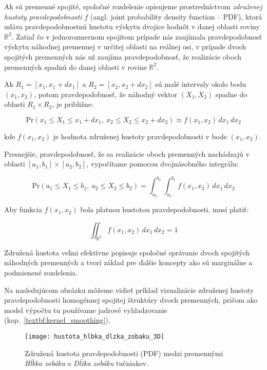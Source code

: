 Ak sú premenné spojité, spoločné rozdelenie opisujeme prostredníctvom \textit{združenej hustoty pravdepodobnosti} $f$ (angl. joint probability density function – PDF), ktorá udáva pravdepodobnostnú hustotu výskytu dvojice hodnôt v danej oblasti roviny $\mathbb{R}^2$.
Zatiaľ čo v jednorozmernom spojitom prípade nás zaujímala pravdepodobnosť výskytu náhodnej premennej v určitej oblasti na reálnej osi, v prípade dvoch spojitých premenných nás už zaujíma pravdepodobnosť, že realizácie oboch premenných spadnú do danej oblasti v rovine $\mathbb{R}^2$.

Ak $R_1 = [x_1, x_1 + dx_1]$ a $R_2 = [x_2, x_2 + dx_2]$ sú malé intervaly okolo bodu $(x_1, x_2)$, potom pravdepodobnosť, že náhodný vektor $(X_1, X_2)$ spadne do oblasti $R_1 \times R_2$, je približne:

\begin{equation}
\mathrm{Pr}(x_1 \leq X_1 \leq x_1 + dx_1,\ x_2 \leq X_2 \leq x_2 + dx_2) \approx f(x_1, x_2) \, dx_1 \, dx_2
\end{equation}

kde $f(x_1, x_2)$ je hodnota združenej hustoty pravdepodobnosti v bode $(x_1, x_2)$.

Presnejšie, pravdepodobnosť, že sa realizácie oboch premenných nachádzajú v oblasti $[a_1, b_1] \times [a_2, b_2]$, vypočítame pomocou dvojnásobného integrálu:

\begin{equation}
\mathrm{Pr}(a_1 \leq X_1 \leq b_1,\ a_2 \leq X_2 \leq b_2) = \int_{a_2}^{b_2} \int_{a_1}^{b_1} f(x_1, x_2) \, dx_1 \, dx_2
\end{equation}

Aby funkcia $f(x_1, x_2)$ bola platnou hustotou pravdepodobnosti, musí platiť:

\begin{equation}
\iint_{\mathbb{R}^2} f(x_1, x_2) \, dx_1 \, dx_2 = 1
\end{equation}

Združená hustota veľmi efektívne popisuje spoločné správanie dvoch spojitých náhodných premenných a tvorí základ pre ďalšie koncepty ako sú marginálne a podmienené rozdelenia.

Na nasledujúcom obrázku môžeme vidieť príklad vizualizácie združenej hustoty pravdepodobnosti homogénnej spojitej štruktúry dvoch premenných, pričom ako model výpočtu tu používame jadrové vyhladzovanie (kap.~\ref{textbf:kernel_smoothing}).

\begin{figure}[htpb]
    \centering
    \texttt{[image: hustota\_hlbka\_dlzka\_zobaku\_3D]}
    \caption{Združená hustota pravdepodobnosti (PDF) medzi premennými \textit{Hĺbka zobáku} a \textit{Dĺžka zobáku} tučniakov.}
    \label{fig:zobak_joint_density}
\end{figure}


